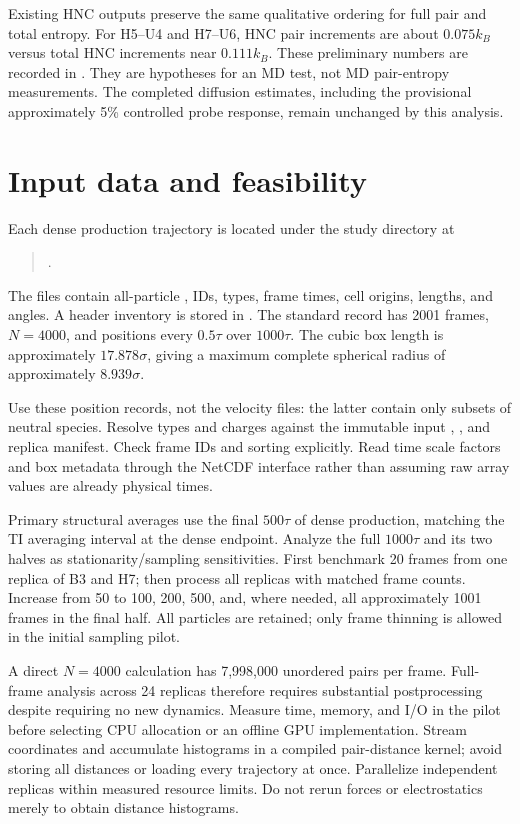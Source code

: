 \documentclass[11pt,a4paper]{article}
\begin{document}
Existing HNC outputs preserve the same qualitative ordering for full pair
and total entropy. For H5--U4 and H7--U6, HNC pair increments are about
$0.075k_B$ versus total HNC increments near $0.111k_B$. These preliminary
numbers are recorded in .
They are hypotheses for an MD test, not MD pair-entropy measurements.
The completed diffusion estimates, including the provisional approximately
5\% controlled probe response, remain unchanged by this analysis.

\section{Input data and feasibility}
Each dense production trajectory is located under the study directory at
\begin{quote}\small
{}.
\end{quote}
The files contain all-particle , IDs, types,
frame times, cell origins, lengths, and angles. A header inventory is stored
in . The standard record
has 2001 frames, $N=4000$, and positions every $0.5\tau$ over $1000\tau$.
The cubic box length is approximately $17.878\sigma$, giving a maximum
complete spherical radius of approximately $8.939\sigma$.

Use these position records, not the velocity files: the latter contain only
subsets of neutral species. Resolve types and charges against the immutable
input , , and replica
manifest. Check frame IDs and sorting explicitly. Read time scale factors
and box metadata through the NetCDF interface rather than assuming raw
array values are already physical times.

Primary structural averages use the final $500\tau$ of dense production,
matching the TI averaging interval at the dense endpoint. Analyze the full
$1000\tau$ and its two halves as stationarity/sampling sensitivities. First
benchmark 20 frames from one replica of B3 and H7; then process all replicas
with matched frame counts. Increase from 50 to 100, 200, 500, and, where
needed, all approximately 1001 frames in the final half. All particles are
retained; only frame thinning is allowed in the initial sampling pilot.

A direct $N=4000$ calculation has 7,998,000 unordered pairs per frame.
Full-frame analysis across 24 replicas therefore requires substantial
postprocessing despite requiring no new dynamics. Measure time, memory,
and I/O in the pilot before selecting CPU allocation or an offline GPU
implementation. Stream coordinates and accumulate histograms in a compiled
pair-distance kernel; avoid storing all distances or loading every trajectory
at once. Parallelize independent replicas within measured resource limits.
Do not rerun forces or electrostatics merely to obtain distance histograms.
\end{document}
